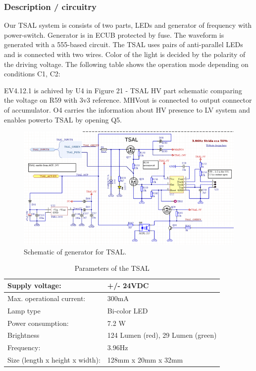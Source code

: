\subsubsection{Description / circuitry}

Our TSAL system is consists of two parts, LEDs and generator of frequency with power-switch. Generator is in ECUB protected by fuse. The waveform is generated with a 555-based circuit. The TSAL uses pairs of anti-parallel LEDs and is connected with two wires. Color of the light is decided by the polarity of the driving voltage. The following table shows the operation mode depending on conditions C1, C2:


EV4.12.1 is achived by U4 in Figure 21 - TSAL HV part schematic comparing the voltage on R59 with 3v3 reference. MHVout is connected to output connector of accumulator. O4 carries the information about HV presence to LV system and enables powerto TSAL by opening Q5.

\begin{figure}[H]
	\centering
	\includegraphics[width=\textwidth]{./img/TSAL-ECUB-schematic.png}
	\caption{Schematic of generator for TSAL.}
	\label{fig:TSAL-ECUB-schematic}
\end{figure}

\begin{table}[H]
	\centering
	\caption{Parameters of the TSAL}
	\begin{tabularx}{\textwidth}{|X|X|}
		\hline
		Supply voltage: & +/- 24VDC \\[\TableSize]
		\hline
		Max. operational current: & 300mA \\[\TableSize]
		\hline
		Lamp type & Bi-color LED \\[\TableSize]
		\hline
		Power consumption: & 7.2 W \\[\TableSize]
		\hline
		Brightness & 124 Lumen (red), 29 Lumen (green) \\[\TableSize]
		\hline
		Frequency: & 3.96Hz \\[\TableSize]
		\hline
		Size (length x height x width): & 128mm x 20mm x 32mm \\[\TableSize]
		\hline
	\end{tabularx}%
	\label{tab:TSAL}%
\end{table}%

